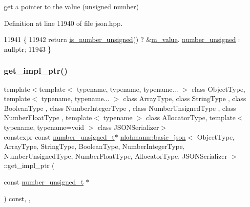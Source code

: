 get a pointer to the value (unsigned number) 



Definition at line 11940 of file json.\+hpp.


\begin{DoxyCode}
11941     \{
11942         \textcolor{keywordflow}{return} \hyperlink{classnlohmann_1_1basic__json_abc7378cba0613a78b9aad1c8e7044bb0}{is\_number\_unsigned}() ? &\hyperlink{classnlohmann_1_1basic__json_aeb0814f76966f99290cb29e127c90a77}{m\_value}.
      \hyperlink{unionnlohmann_1_1basic__json_1_1json__value_a0299a6aa3bc4d45d54130e52970f73d3}{number\_unsigned} : \textcolor{keyword}{nullptr};
11943     \}
\end{DoxyCode}
\mbox{\label{classnlohmann_1_1basic__json_a52d0c7f354c6155221540baef5b98d0a}} 
\subsubsection{\texorpdfstring{get\+\_\+impl\+\_\+ptr()}{get\_impl\_ptr()}\hspace{0.1cm}{\footnotesize\ttfamily [12/14]}}
{\footnotesize\ttfamily template$<$template$<$ typename, typename, typename... $>$ class Object\+Type, template$<$ typename, typename... $>$ class Array\+Type, class String\+Type , class Boolean\+Type , class Number\+Integer\+Type , class Number\+Unsigned\+Type , class Number\+Float\+Type , template$<$ typename $>$ class Allocator\+Type, template$<$ typename, typename=void $>$ class J\+S\+O\+N\+Serializer$>$ \\
constexpr const \hyperlink{classnlohmann_1_1basic__json_ab906e29b5d83ac162e823ada2156b989}{number\+\_\+unsigned\+\_\+t}$\ast$ \hyperlink{classnlohmann_1_1basic__json}{nlohmann\+::basic\+\_\+json}$<$ Object\+Type, Array\+Type, String\+Type, Boolean\+Type, Number\+Integer\+Type, Number\+Unsigned\+Type, Number\+Float\+Type, Allocator\+Type, J\+S\+O\+N\+Serializer $>$\+::get\+\_\+impl\+\_\+ptr (\begin{DoxyParamCaption}\item[{const \hyperlink{classnlohmann_1_1basic__json_ab906e29b5d83ac162e823ada2156b989}{number\+\_\+unsigned\+\_\+t} $\ast$}]{ }\end{DoxyParamCaption}) const\hspace{0.3cm}{\ttfamily [inline]}, {\ttfamily [private]}, {\ttfamily [noexcept]}}



